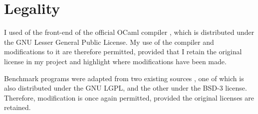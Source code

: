 \section{Legality}
I used of the front-end of the official OCaml compiler \cite{ocaml}, which is distributed under the GNU Lesser General Public License. My use of the compiler and modifications to it are therefore permitted, provided that I retain the original license in my project and highlight where modifications have been made. 

Benchmark programs were adapted from two existing sources \cite{chris00, benchmark-game}, one of which is also distributed under the GNU LGPL, and the other under the BSD-3 license. Therefore, modification is once again permitted, provided the original licenses are retained.



